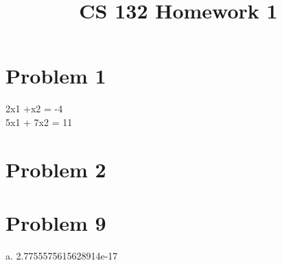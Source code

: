 \documentclass [12pt]{article}
\begin{document}
\title{CS 132 Homework 1}
\maketitle



\section{Problem 1}
2x1 +x2 = -4\\

5x1 + 7x2 = 11

 

\section{Problem 2}


\section{Problem 9}

a. 2.7755575615628914e-17 
\end{document}
